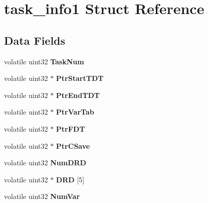 \hypertarget{structtask__info1}{}\section{task\+\_\+info1 Struct Reference}
\label{structtask__info1}
\subsection*{Data Fields}
\begin{DoxyCompactItemize}
\item 
\mbox{\label{structtask__info1_a5be27687f455b9659b58ffe0c8b58d05}} 
volatile uint32 {\bfseries Task\+Num}
\item 
\mbox{\label{structtask__info1_a42105c8fbdd72154fe9150a171ed60c9}} 
volatile uint32 $\ast$ {\bfseries Ptr\+Start\+T\+DT}
\item 
\mbox{\label{structtask__info1_a5386edf51bcc0339291faa894f065cf7}} 
volatile uint32 $\ast$ {\bfseries Ptr\+End\+T\+DT}
\item 
\mbox{\label{structtask__info1_a55c185df362a83f4a1d50448b1009ac6}} 
volatile uint32 $\ast$ {\bfseries Ptr\+Var\+Tab}
\item 
\mbox{\label{structtask__info1_ae7f6a3637489105b030562f6a4a629a4}} 
volatile uint32 $\ast$ {\bfseries Ptr\+F\+DT}
\item 
\mbox{\label{structtask__info1_aec7a50afcd4aa6d66255c1168f4a1a90}} 
volatile uint32 $\ast$ {\bfseries Ptr\+C\+Save}
\item 
\mbox{\label{structtask__info1_a548794ca10a62ced370027b4fb11322c}} 
volatile uint32 {\bfseries Num\+D\+RD}
\item 
\mbox{\label{structtask__info1_a8a8c80b619bef1e5c2c75c02f3e98783}} 
volatile uint32 $\ast$ {\bfseries D\+RD} \mbox{[}5\mbox{]}
\item 
\mbox{\label{structtask__info1_a128bc23b6511eca711b1224dd0f73b16}} 
volatile uint32 {\bfseries Num\+Var}
\item 

\end{DoxyCompactItemize}

